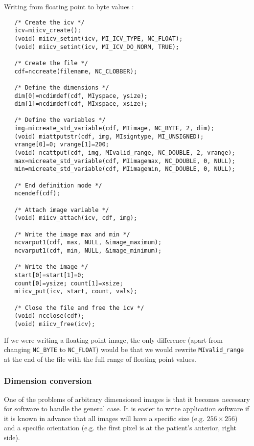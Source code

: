 Writing from floating point to byte values :

\begin{verbatim}
   /* Create the icv */
   icv=miicv_create();
   (void) miicv_setint(icv, MI_ICV_TYPE, NC_FLOAT);
   (void) miicv_setint(icv, MI_ICV_DO_NORM, TRUE);

   /* Create the file */
   cdf=nccreate(filename, NC_CLOBBER);

   /* Define the dimensions */
   dim[0]=ncdimdef(cdf, MIyspace, ysize);
   dim[1]=ncdimdef(cdf, MIxspace, xsize);

   /* Define the variables */
   img=micreate_std_variable(cdf, MIimage, NC_BYTE, 2, dim);
   (void) miattputstr(cdf, img, MIsigntype, MI_UNSIGNED);
   vrange[0]=0; vrange[1]=200;
   (void) ncattput(cdf, img, MIvalid_range, NC_DOUBLE, 2, vrange);
   max=micreate_std_variable(cdf, MIimagemax, NC_DOUBLE, 0, NULL);
   min=micreate_std_variable(cdf, MIimagemin, NC_DOUBLE, 0, NULL);

   /* End definition mode */
   ncendef(cdf);

   /* Attach image variable */
   (void) miicv_attach(icv, cdf, img);

   /* Write the image max and min */
   ncvarput1(cdf, max, NULL, &image_maximum);
   ncvarput1(cdf, min, NULL, &image_minimum);

   /* Write the image */
   start[0]=start[1]=0;
   count[0]=ysize; count[1]=xsize;
   miicv_put(icv, start, count, vals);

   /* Close the file and free the icv */
   (void) ncclose(cdf);
   (void) miicv_free(icv);
\end{verbatim}

If we were writing a floating point image, the only difference (apart
from changing \verb+NC_BYTE+ to \verb+NC_FLOAT+) would be that we
would rewrite \verb+MIvalid_range+ at the end of the file with the
full range of floating point values.

\subsubsection{Dimension conversion}

One of the problems of arbitrary dimensioned images is that it becomes
necessary for software to handle the general case. It is easier to write
application software if it is known in advance that all images will
have a specific size (e.g. $256\times 256$) and a specific orientation
(e.g. the first pixel is at the patient's anterior, right side). 

